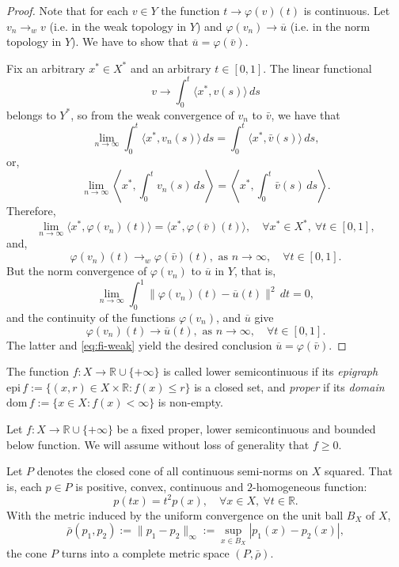 \documentclass[12pt,leqno]{article}
\theoremstyle{definition}
\theoremstyle{remark}
\def\ol{\overline}
\def\R{\mathbb{R}}
\def\Ri{\mathbb{R}\cup\{+\infty\}}
\def\epi{\mathrm{epi\,}}
\def\dom{\mathrm{dom\,}}
\begin{document}
\begin{proof}
     Note that for each $v\in Y$ the function $
        t \to \varphi(v)(t)
    $
    is continuous. Let
    $
          v_n \to_w  v$ (i.e. in the weak topology in $Y$) and $\varphi(v_n) \to \ol u$ (i.e. in the norm topology in $Y$).
    We have to show that $\ol u = \varphi(\bar v)$.

    Fix an arbitrary $x^*\in X^*$ and an arbitrary $t\in[0,1]$. The linear functional
    $$
        v \to \int_0^t \langle x^*, v(s)\rangle \, ds
    $$
    belongs to  $Y^*$, so from the weak convergence of $v_n$ to $\bar v$, we have that
    $$
        \lim_{n\to\infty} \int_0^t \langle x^*, v_n(s)\rangle \, ds= \int_0^t \langle x^*, \bar v(s)\rangle \, ds,
    $$
    or,
    $$
        \lim_{n\to\infty} \left\langle x^*, \int_0^t v_n(s) \, ds\right\rangle = \left\langle x^*, \int_0^t \bar v(s) \, ds\right\rangle.
    $$
    Therefore,
    $$
        \lim_{n\to\infty} \langle x^*,\varphi(v_n)(t)\rangle = \langle x^*,\varphi(\bar v)(t)\rangle, \quad \forall x^*\in X^*,\ \forall t\in[0,1],
    $$
    and,
    \begin{equation}
        \label{eq:fi-weak}
        \varphi(v_n)(t) \to_w \varphi(\bar v)(t), \text{ as }n\to \infty, \quad \forall t\in[0,1].
    \end{equation}
    But the norm convergence of $\varphi(v_n)$ to $\ol u$ in $Y$, that is,
    $$
        \lim_{n\to\infty} \int_0^1 \|\varphi(v_n)(t) - \ol u(t)\|^2\, dt = 0,
    $$
    and the continuity of the functions $\varphi(v_n)$, and $\ol u$ give
    $$
         \varphi(v_n)(t) \to \ol u(t), \text{ as }n\to \infty, \quad \forall t\in[0,1].
    $$
    The latter and \eqref{eq:fi-weak} yield the desired conclusion $\ol u = \varphi(\bar v)$.
    \end{proof}

The function $f:X\to\Ri$ is called lower semicontinuous if its \emph{epigraph} $\epi f:=\{ (x,r)\in X\times \R: f(x)\le r\}$ is a closed set, and \emph{proper} if its \emph{domain} $\dom f:=\{ x\in X:f(x)<\infty\}$ is non-empty.

Let $f: X \to \mathbb{R} \cup \{+\infty\}$ be a fixed proper, lower semicontinuous and bounded below  function. We will assume without loss of generality that $f\ge0$.

Let $P$ denotes the closed cone of all continuous semi-norms on $X$ squared. That is, each $p\in P$ is positive, convex, continuous and $2$-homogeneous function:
$$
    p(tx) = t^2p(x),\quad\forall x\in X,\ \forall t\in\mathbb{R}.
$$
With the metric induced by the uniform convergence on the unit ball $B_X$ of $X$,
$$
    \bar\rho(p_1,p_2) := \| {p_1}- {p_2}\|_\infty := \sup_{x\in B_X} | {p_1(x)} -  {p_2(x)}|,
$$
the cone $P$ turns into a complete metric space $(P,\bar\rho)$.
\end{document}
